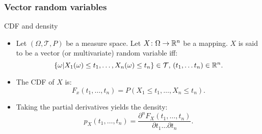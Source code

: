 \documentclass[main.tex]{subfiles}
\begin{document}
\begin{frame}
    \frametitle{Vector random variables}
\begin{block}{CDF and density}
    \begin{itemize}
        \item<+-> Let $\left(\Omega , \mathcal{T}, P  \right)$ be a measure space. Let $X \colon \Omega \to \mathbb{R}^n$ be a mapping.
        $X$ is said to be a vector (or multivariate) random variable iff:
        \begin{equation}
            \left\{ \omega \vert X_1(\omega) \leq t_1, \dots, X_n(\omega) \leq t_n \right\} \in \mathcal{T},  \, (t_1,\dots t_n) \in \mathbb{R}^n.
        \end{equation}
        \item<+-> The CDF of $X$ is:
        \begin{equation}
           F_x(t_1,\dots,t_n)=P\left( X_1 \leq t_1, \dots, X_n \leq t_n \right).
        \end{equation}
        \item<+-> Taking the partial derivatives yields the density:
        \begin{equation}
            p_X(t_1,\dots, t_n) = \frac{\partial^n F_X(t_1,\dots,t_n) }{\partial t_1\dots \partial t_n}.
        \end{equation}
    \end{itemize}
\end{block}
\end{frame}
\end{document}
